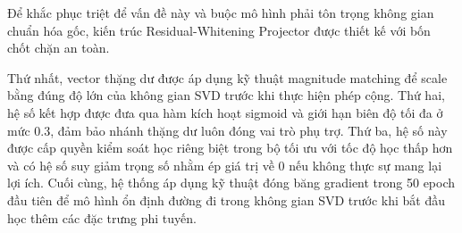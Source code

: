 Để khắc phục triệt để vấn đề này và buộc mô hình phải tôn trọng không gian chuẩn hóa gốc, kiến trúc Residual-Whitening Projector được thiết kế với bốn chốt chặn an toàn. 

Thứ nhất, vector thặng dư được áp dụng kỹ thuật magnitude matching để scale bằng đúng độ lớn của không gian SVD trước khi thực hiện phép cộng. Thứ hai, hệ số kết hợp được đưa qua hàm kích hoạt sigmoid và giới hạn biên độ tối đa ở mức 0.3, đảm bảo nhánh thặng dư luôn đóng vai trò phụ trợ. Thứ ba, hệ số này được cấp quyền kiểm soát học riêng biệt trong bộ tối ưu với tốc độ học thấp hơn và có hệ số suy giảm trọng số nhằm ép giá trị về 0 nếu không thực sự mang lại lợi ích. Cuối cùng, hệ thống áp dụng kỹ thuật đóng băng gradient trong 50 epoch đầu tiên để mô hình ổn định đường đi trong không gian SVD trước khi bắt đầu học thêm các đặc trưng phi tuyến.

